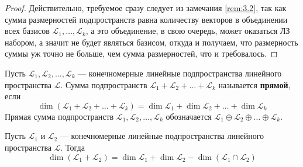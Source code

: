 \documentclass[11pt]{article}
\begin{document}
\begin{proof}
    Действительно, требуемое сразу следует из замечания \ref{rem:3.2}, так как сумма размерностей подпространств равна количеству векторов в объединении всех базисов $\mathcal{L}_1, \ldots, \mathcal{L}_k$, а это объединение, в свою очередь, может оказаться ЛЗ набором, а значит 
    не будет являться базисом, откуда и получаем, что размерность суммы уж точно не больше, чем сумма размерностей, что и требовалось.
\end{proof}

\begin{definition}
    Пусть $\mathcal{L}_1, \mathcal{L}_2, \ldots, \mathcal{L}_k$ --- конечномерные линейные подпространства линейного пространства $\mathcal{L}$. Сумма подпространств $\mathcal{L}_1 + \mathcal{L}_2 + \ldots + \mathcal{L}_k$ называется \textbf{прямой}, если 
    \[\dim \left(\mathcal{L}_1 + \mathcal{L}_2 + \ldots + \mathcal{L}_k\right) = \dim \mathcal{L}_1 + \dim \mathcal{L}_2 + \ldots + \dim \mathcal{L}_k\]
    Прямая сумма подпространств $\mathcal{L}_1, \mathcal{L}_2, \ldots, \mathcal{L}_k$ обозначается $\mathcal{L}_1 \oplus \mathcal{L}_2 \oplus \ldots \oplus \mathcal{L}_k$.
\end{definition}

\begin{theorem}
    Пусть $\mathcal{L}_1$ и $\mathcal{L}_2$ --- конечномерные линейные подпространства линейного пространства $\mathcal{L}$. Тогда
    \[\dim \left(\mathcal{L}_1 + \mathcal{L}_2\right) = \dim \mathcal{L}_1 + \dim \mathcal{L}_2 - \dim \left(\mathcal{L}_1 \cap \mathcal{L}_2\right)\]
\end{theorem}
\end{document}
